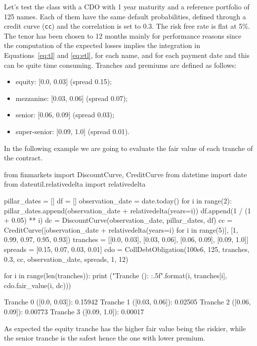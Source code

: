 Let's test the class with a CDO with 1 year maturity and a reference portfolio of 125 names. Each of them have the same default probabilities, defined through a credit curve (\texttt{cc}) and the correlation is set to 0.3. The risk free rate is flat at 5\%. The tenor has been chosen to 12 months mainly for performance reasons since the computation of the expected losses implies the integration in Equations~\ref{eq:tl} and \ref{eq:etl}, for each name, and for each payment date and this can be quite time consuming.
Tranches and premiums are defined as follows:
\begin{itemize}
	\item equity: [0.0, 0.03] (spread 0.15);
	\item mezzanine: [0.03, 0.06] (spread 0.07);
	\item senior: [0.06, 0.09] (spread 0.03);
	\item super-senior: [0.09, 1.0] (spread 0.01).
\end{itemize}

In the following example we are going to evaluate the fair value of each tranche of the contract.

\begin{ipython}
from finmarkets import DiscountCurve, CreditCurve
from datetime import date
from dateutil.relativedelta import relativedelta

pillar_dates = []
df = []
observation_date = date.today()
for i in range(2):
    pillar_dates.append(observation_date + relativedelta(years=i))
    df.append(1 / (1 + 0.05) ** i)
dc = DiscountCurve(observation_date, pillar_dates, df)
cc = CreditCurve([observation_date + relativedelta(years=i) for i in range(5)],
                 [1, 0.99, 0.97, 0.95, 0.93])
tranches = [[0.0, 0.03], [0.03, 0.06], [0.06, 0.09], [0.09, 1.0]]
spreads = [0.15, 0.07, 0.03, 0.01]
cdo = CollDebtObligation(100e6, 125, tranches, 0.3, cc,
          observation_date, spreads, 1, 12)
          
for i in range(len(tranches)):
    print ("Tranche {} ({}): {:.5f}".format(i, tranches[i], cdo.fair_value(i, dc)))
\end{ipython}
\begin{ioutput}
Tranche 0 ([0.0, 0.03]): 0.15942
Tranche 1 ([0.03, 0.06]): 0.02505
Tranche 2 ([0.06, 0.09]): 0.00773
Tranche 3 ([0.09, 1.0]): 0.00017
\end{ioutput}

As expected the equity tranche has the higher fair value being the riskier, while the senior tranche is the safest hence the one with lower premium.

